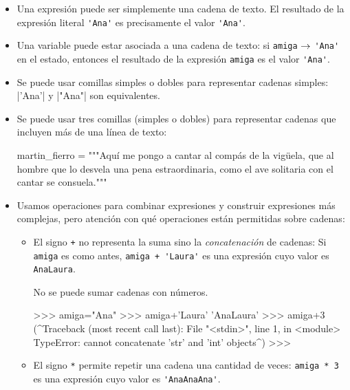 \begin{itemize}
\item Una expresión puede ser simplemente una cadena de texto.  El resultado de
    la expresión literal \lstinline!'Ana'! es precisamente el valor \lstinline!'Ana'!.

\item Una variable puede estar asociada a una cadena de texto: si
    \lstinline!amiga! $\rightarrow$ \lstinline!'Ana'! en el estado, entonces el
    resultado de la expresión \lstinline!amiga! es el valor \lstinline!'Ana'!.

\item Se puede usar comillas simples o dobles para representar cadenas simples:
    |'Ana'| y |"Ana"| son equivalentes.

\item Se puede usar tres comillas (simples o dobles) para representar cadenas
    que incluyen más de una línea de texto:

\begin{codigo-python-sn}
martin_fierro = """Aquí me pongo a cantar
al compás de la vigüela,
que al hombre que lo desvela
una pena estraordinaria,
como el ave solitaria
con el cantar se consuela."""
\end{codigo-python-sn}

\item Usamos operaciones para combinar expresiones y construir
expresiones más complejas, pero atención con qué operaciones están
permitidas sobre cadenas:

\begin{itemize}
    \item El signo \lstinline!+! no representa la suma sino la
        \emph{concatenación} de cadenas: Si \lstinline!amiga! es como antes,
        \lstinline!amiga + 'Laura'!  es una expresión cuyo valor es
        \lstinline!AnaLaura!.

\begin{atencion}
No se puede sumar cadenas con números.
\begin{codigo-python-sn}
>>> amiga="Ana"
>>> amiga+'Laura'
'AnaLaura'
>>> amiga+3
(^Traceback (most recent call last):
  File "<stdin>", line 1, in <module>
TypeError: cannot concatenate 'str' and 'int' objects^)
>>>
\end{codigo-python-sn}
\end{atencion}

\item El signo \lstinline!*! permite repetir una cadena una cantidad de veces:
    \lstinline!amiga * 3! es una expresión cuyo valor es
    \lstinline!'AnaAnaAna'!.


\end{itemize}
\end{itemize}
